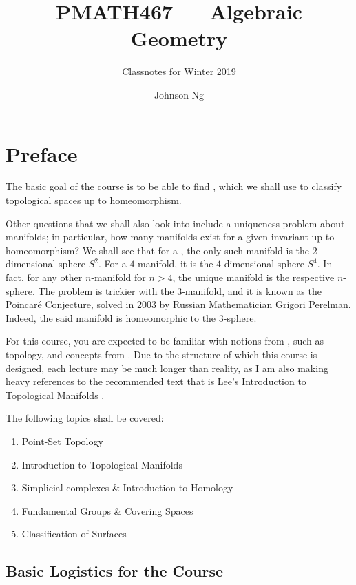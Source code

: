 \documentclass[notoc,notitlepage]{tufte-book}
\title{PMATH467 --- Algebraic Geometry}
\author{Johnson Ng}
\subtitle{Classnotes for Winter 2019}
\begin{document}


\chapter*{Preface}%
\label{chp:preface}

The basic goal of the course is to be able to find , which we shall use to classify topological spaces up to homeomorphism.

Other questions that we shall also look into include a uniqueness problem about manifolds; in particular, how many manifolds exist for a given invariant up to homeomorphism? We shall see that for a , the only such manifold is the 2-dimensional sphere $S^2$. For a $4$-manifold, it is the $4$-dimensional sphere $S^4$. In fact, for any other $n$-manifold for $n > 4$, the unique manifold is the respective $n$-sphere. The problem is trickier with the $3$-manifold, and it is known as the Poincar\'{e} Conjecture, solved in 2003 by Russian Mathematician \href{https://en.wikipedia.org/wiki/Grigori_Perelman}{Grigori Perelman}. Indeed, the said manifold is homeomorphic to the $3$-sphere.

For this course, you are expected to be familiar with notions from ,
such as topology, and concepts from . Due to the structure of which this
course is designed, each lecture may be much longer than reality, as I am also making heavy
references to the recommended text that is Lee's Introduction to Topological Manifolds
\cite{johnlee2000}.

The following topics shall be covered:
\begin{enumerate}
  \item Point-Set Topology
  \item Introduction to Topological Manifolds
  \item Simplicial complexes \& Introduction to Homology
  \item Fundamental Groups \& Covering Spaces
  \item Classification of Surfaces
\end{enumerate}

\section*{Basic Logistics for the Course}%
\end{document}
